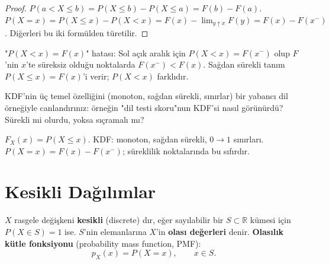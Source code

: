 \begin{proof}
$P(a < X \leq b) = P(X \leq b) - P(X \leq a) = F(b) - F(a)$.
$P(X = x) = P(X \leq x) - P(X < x) = F(x) - \lim_{y \uparrow x} F(y) = F(x) - F(x^-)$.
Diğerleri bu iki formülden türetilir.
\end{proof}

\begin{hataanalizi}
"$P(X < x) = F(x)$" hatası: Sol açık aralık için $P(X < x) = F(x^-)$
olup $F$'nin $x$'te süreksiz olduğu noktalarda $F(x^-) < F(x)$.
Sağdan sürekli tanım $P(X \leq x) = F(x)$'i verir; $P(X < x)$ farklıdır.
\end{hataanalizi}

\begin{kendinleifade}
KDF'nin üç temel özelliğini (monoton, sağdan sürekli, sınırlar)
bir yabancı dil örneğiyle canlandırınız: örneğin "dil testi skoru"nun
KDF'si nasıl görünürdü? Sürekli mi olurdu, yoksa sıçramalı mı?
\end{kendinleifade}

\begin{mikroozet}
$F_X(x) = P(X \leq x)$. KDF: monoton, sağdan sürekli, $0 \to 1$ sınırları.
$P(X = x) = F(x) - F(x^-)$; süreklilik noktalarında bu sıfırdır.
\end{mikroozet}

\section{Kesikli Dağılımlar}
\label{sec:kesikli}

\begin{tanim}
\label{def:kesikli}
$X$ rasgele değişkeni \textbf{kesikli} (discrete) dır, eğer
sayılabilir bir $S \subset \mathbb{R}$ kümesi için $P(X \in S) = 1$ ise.
$S$'nin elemanlarına $X$'in \textbf{olası değerleri} denir.
\textbf{Olasılık kütle fonksiyonu} (probability mass function, PMF):
\[
  p_X(x) = P(X = x), \qquad x \in S.
\]
\end{tanim}

